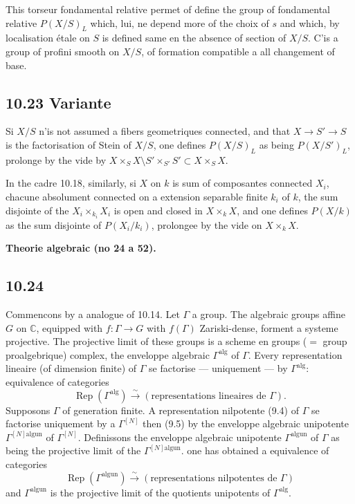 \documentclass[12pt,a4paper]{article}
\theoremstyle{plain}
\theoremstyle{definition}
\theoremstyle{remark}
\DeclareMathOperator{\Rep}{Rep}
\newcommand{\C}{\mathbb{C}}
\newcommand{\alg}{\mathrm{alg}}
\newcommand{\un}{\mathrm{un}}
\begin{document}
This torseur fondamental relative permet of define the group of fondamental relative $P(X/S)_L$ which, lui, ne depend more of the choix of $s$ and which, by localisation étale on $S$ is defined same en the absence of section of $X/S$. C'is a group of profini smooth on $X/S$, of formation compatible a all changement of base.

\subsection*{10.23 Variante}

Si $X/S$ n'is not assumed a fibers geometriques connected, and that $X \to S' \to S$ is the factorisation of Stein of $X/S$, one defines $P(X/S)_L$ as being $P(X/S')_L$, prolonge by the vide by $X \times_S X \setminus S' \times_{S'} S' \subset X \times_S X$.

In the cadre 10.18, similarly, si $X$ on $k$ is sum of composantes connected $X_i$, chacune absolument connected on a extension separable finite $k_i$ of $k$, the sum disjointe of the $X_i \times_{k_i} X_i$ is open and closed in $X \times_k X$, and one defines $P(X/k)$ as the sum disjointe of $P(X_i/k_i)$, prolongee by the vide on $X \times_k X$.

\textbf{Theorie algebraic (no 24 a 52).}

\subsection*{10.24}

Commencons by a analogue of 10.14. Let $\Gamma$ a group. The algebraic groups affine $G$ on $\C$, equipped with $f: \Gamma \to G$ with $f(\Gamma)$ Zariski-dense, forment a systeme projective. The projective limit of these groups is a scheme en groups ($=$ group proalgebrique) complex, the enveloppe algebraic $\Gamma^{\alg}$ of $\Gamma$. Every representation lineaire (of dimension finite) of $\Gamma$ se factorise --- uniquement --- by $\Gamma^{\alg}$: equivalence of categories
\begin{equation}\label{10.24.1}
\Rep(\Gamma^{\alg}) \xrightarrow{\sim} (\text{representations lineaires de } \Gamma). \tag{10.24.1}
\end{equation}
Supposons $\Gamma$ of generation finite. A representation nilpotente (9.4) of $\Gamma$ se factorise uniquement by a $\Gamma^{[N]}$ then (9.5) by the enveloppe algebraic unipotente $\Gamma^{[N] \alg \un}$ of $\Gamma^{[N]}$. Definissons the enveloppe algebraic unipotente $\Gamma^{\alg \un}$ of $\Gamma$ as being the projective limit of the $\Gamma^{[N] \alg \un}$. one has obtained a equivalence of categories
\begin{equation}\label{10.24.2}
\Rep(\Gamma^{\alg \un}) \xrightarrow{\sim} (\text{representations nilpotentes de } \Gamma) \tag{10.24.2}
\end{equation}
and $\Gamma^{\alg \un}$ is the projective limit of the quotients unipotents of $\Gamma^{\alg}$.
\end{document}
